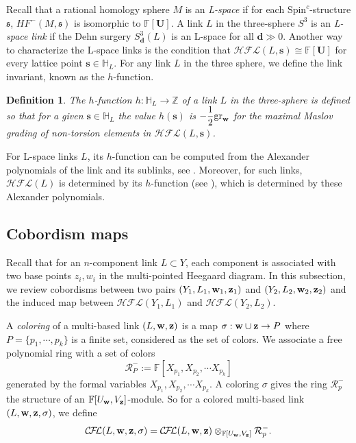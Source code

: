 \documentclass{amsart}
\newtheorem{definition}[theorem]{Definition}
\newcommand{\F}{\mathbb{F}}
\newcommand{\cCFL}{\mathcal{C\!F\!L}}
\newcommand{\cHFL}{\mathcal{H\!F\! L}}
\newcommand{\Spin}{\text{Spin}^{c}}
\newcommand{\w}{\mathbf{w}}
\def\gr{\textup{gr}}
\def\w{{\bf{w}}}
\def\z{{\bf{z}}}
\newcommand{\HH}{\mathbb{H}}
\newcommand{\Z}{\mathbb{Z}}
\newcommand{\UU}{\mathbf{U}}
\renewcommand{\ss}{\mathbf{s}}
\begin{document}
Recall that a rational homology sphere $M$ is an \emph{L-space} if for each $\Spin$-structure $\mathfrak{s}$,  $HF^-(M, \mathfrak{s})$ is isomorphic to $\F[\UU]$. A link $L$ in the three-sphere $S^3$ is an \emph{L-space link} if the Dehn surgery $S^3_{\mathbf{d}}(L)$ is an L-space for all $\mathbf{d}\gg 0$. Another way to characterize the L-space links is the condition that $\cHFL(L, \ss)\cong \F[\UU]$ for every lattice point $\ss\in \HH_L$. For any link $L$ in the three sphere, we define the link invariant,  known as the $h$-function.

\begin{definition}
    The $h$-function $h:\HH_L\to \Z$ of a link $L$ in the three-sphere is defined so that  for a given $\ss\in \HH_L$ the value $h(\ss)$ is  $-\dfrac{1}{2} \gr_{\w}$ for the maximal Maslov grading of non-torsion elements in $\cHFL(L, \ss)$. 
\end{definition}

For L-space links $L$, its $h$-function can be computed from the Alexander polynomials of the link and its sublinks, see \cite{BorodzikGorskyImmersed}. Moreover, for such links, $\cHFL(L)$ is determined by its $h$-function (see \cite{BLZ}), which is determined by these Alexander polynomials. 


\subsection{Cobordism maps}
\label{sec: cobordism maps}

Recall that for an $n$-component link $L\subset Y$, each component is associated with two base points $z_i, w_i$  in the multi-pointed Heegaard diagram. In this subsection, we review cobordisms between two pairs $(Y_1, L_1, \w_1, \z_1)$ and $(Y_2, L_2, \w_2, \z_2)$ and the induced map between $\cHFL(Y_1, L_1)$ and $\cHFL(Y_2, L_2)$. 

A \emph{coloring} of a multi-based link $(L, \w, \z)$ is a map $\sigma: \w\cup \z\rightarrow P$ where $P=\{p_1, \cdots, p_k\}$ is a finite set, considered as the set of colors. We associate a free polynomial ring with a set of colors 
$$\mathcal{R}_P^-:=\F[X_{p_1}, X_{p_2}, \cdots X_{p_k}]$$
generated by the formal variables $X_{p_1}, X_{p_2}, \cdots X_{p_k}$. A coloring  $\sigma$ gives the ring $\mathcal{R}_p^-$ the structure of an $\F[U_{\w}, V_{\z}]$-module. So for a colored multi-based link $(L, \w, \z, \sigma)$, we define
$$\cCFL(L, \w, \z, \sigma)=\cCFL(L, \w, \z)\otimes_{\F[U_{\w}, V_{\z}]} \mathcal{R}_p^-. $$
\end{document}
